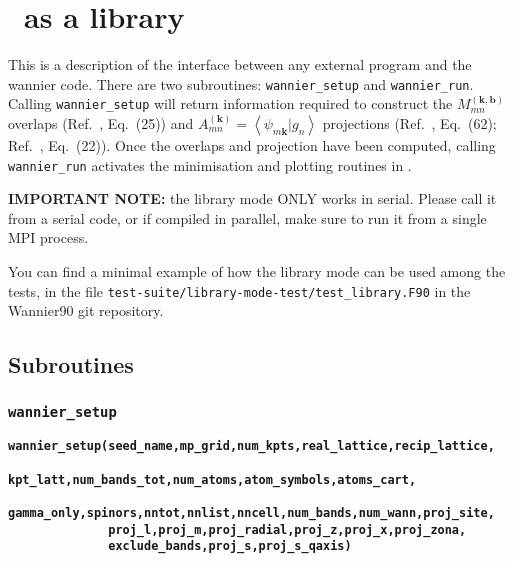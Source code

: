 \chapter{\wannier\ as a library}\label{ch:wann-lib}

This is a description of the interface between any external program
and the wannier code. There are two subroutines: \verb#wannier_setup#
and \verb#wannier_run#. Calling \verb#wannier_setup# will return
information required to construct the $M_{mn}^{(\mathbf{k,b})}$
overlaps (Ref.~\cite{marzari-prb97}, Eq.~(25)) and
$A_{mn}^{(\mathbf{k})}=\left\langle
  \psi_{m\mathbf{k}}|g_{n}\right\rangle$ projections
(Ref.~\cite{marzari-prb97}, Eq.~(62); Ref.~\cite{souza-prb01},
Eq.~(22)). Once the overlaps and projection have been computed,
calling \verb#wannier_run# activates the minimisation and plotting
routines in \wannier.

\textbf{IMPORTANT NOTE:} the library mode ONLY works in serial. Please
call it from a serial code, or if compiled in parallel, make sure to run
it from a single MPI process.

You can find a minimal example of how the library mode can be used
among the tests, in the file
\verb|test-suite/library-mode-test/test_library.F90|
in the Wannier90 git repository.


\section{Subroutines}

\subsection{{\tt wannier\_setup}}

{\noindent \bf \verb#wannier_setup(seed_name,mp_grid,num_kpts,real_lattice,recip_lattice,#\\
\verb#              kpt_latt,num_bands_tot,num_atoms,atom_symbols,atoms_cart,#\\
\verb#              gamma_only,spinors,nntot,nnlist,nncell,num_bands,num_wann,proj_site,#\\
\verb#              proj_l,proj_m,proj_radial,proj_z,proj_x,proj_zona,#\\
\verb#              exclude_bands,proj_s,proj_s_qaxis)#}

